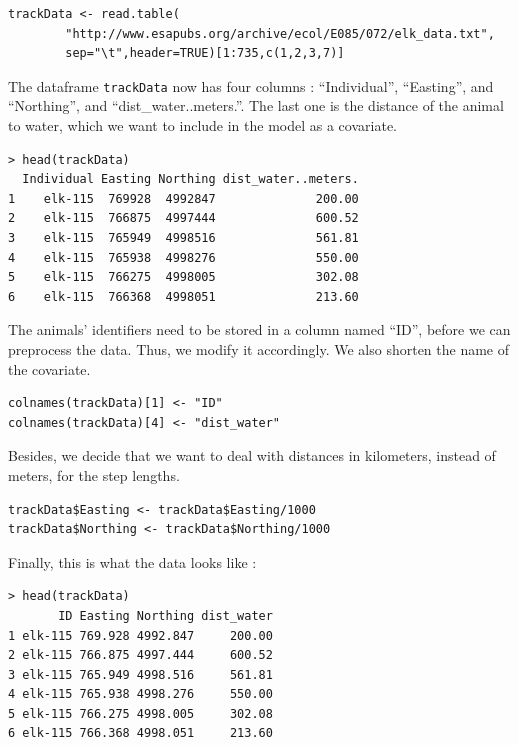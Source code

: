 \documentclass[]{article}
\begin{document}
\begin{lstlisting}
trackData <- read.table(
		"http://www.esapubs.org/archive/ecol/E085/072/elk_data.txt",
		sep="\t",header=TRUE)[1:735,c(1,2,3,7)]
\end{lstlisting}

The dataframe \texttt{trackData} now has four columns : ``Individual'', ``Easting'', and ``Northing'', and ``dist\_water..meters.''. The last one is the distance of the animal to water, which we want to include in the model as a covariate.

\begin{lstlisting}
> head(trackData)
  Individual Easting Northing dist_water..meters.
1    elk-115  769928  4992847              200.00
2    elk-115  766875  4997444              600.52
3    elk-115  765949  4998516              561.81
4    elk-115  765938  4998276              550.00
5    elk-115  766275  4998005              302.08
6    elk-115  766368  4998051              213.60
\end{lstlisting}

The animals' identifiers need to be stored in a column named ``ID'', before we can preprocess the data. Thus, we modify it accordingly. We also shorten the name of the covariate.

\begin{lstlisting}
colnames(trackData)[1] <- "ID"
colnames(trackData)[4] <- "dist_water"
\end{lstlisting}

Besides, we decide that we want to deal with distances in kilometers, instead of meters, for the step lengths.
\begin{lstlisting}
trackData$Easting <- trackData$Easting/1000
trackData$Northing <- trackData$Northing/1000
\end{lstlisting}

\noindent Finally, this is what the data looks like :
\begin{lstlisting}
> head(trackData)
       ID Easting Northing dist_water
1 elk-115 769.928 4992.847     200.00
2 elk-115 766.875 4997.444     600.52
3 elk-115 765.949 4998.516     561.81
4 elk-115 765.938 4998.276     550.00
5 elk-115 766.275 4998.005     302.08
6 elk-115 766.368 4998.051     213.60
\end{lstlisting}
\end{document}
